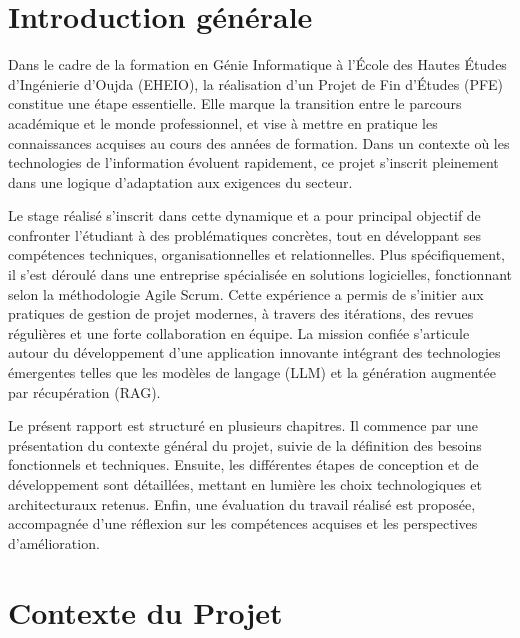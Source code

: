 \documentclass[12pt,a4paper]{report}
\begin{document}
	
	\tableofcontents

	
	\listoffigures

	
	\listoftables

	
	\clearpage
	
	
	\chapter*{Introduction générale}
	
	Dans le cadre de la formation en Génie Informatique à l’École des Hautes Études d’Ingénierie d’Oujda (EHEIO), la réalisation d’un Projet de Fin d’Études (PFE) constitue une étape essentielle. Elle marque la transition entre le parcours académique et le monde professionnel, et vise à mettre en pratique les connaissances acquises au cours des années de formation. Dans un contexte où les technologies de l’information évoluent rapidement, ce projet s’inscrit pleinement dans une logique d’adaptation aux exigences du secteur.
	
	Le stage réalisé s’inscrit dans cette dynamique et a pour principal objectif de confronter l’étudiant à des problématiques concrètes, tout en développant ses compétences techniques, organisationnelles et relationnelles. Plus spécifiquement, il s’est déroulé dans une entreprise spécialisée en solutions logicielles, fonctionnant selon la méthodologie Agile Scrum. Cette expérience a permis de s’initier aux pratiques de gestion de projet modernes, à travers des itérations, des revues régulières et une forte collaboration en équipe. La mission confiée s’articule autour du développement d’une application innovante intégrant des technologies émergentes telles que les modèles de langage (LLM) et la génération augmentée par récupération (RAG).
	
	Le présent rapport est structuré en plusieurs chapitres. Il commence par une présentation du contexte général du projet, suivie de la définition des besoins fonctionnels et techniques. Ensuite, les différentes étapes de conception et de développement sont détaillées, mettant en lumière les choix technologiques et architecturaux retenus. Enfin, une évaluation du travail réalisé est proposée, accompagnée d’une réflexion sur les compétences acquises et les perspectives d’amélioration.
	
	\chapter{Contexte du Projet}
	
\end{document}
